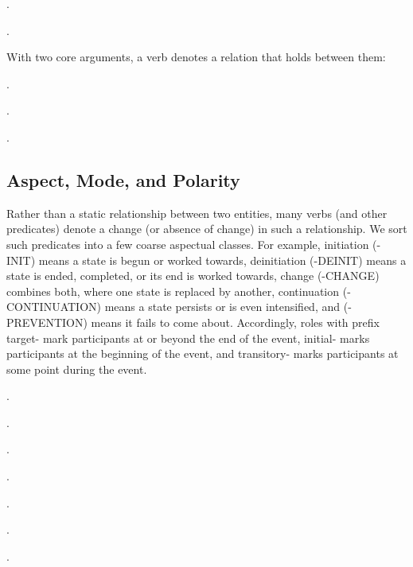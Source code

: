 \documentclass[a4paper]{article}
\newcommand{\frs}[1]{\mbox{\textsf{#1}}} %
\newcommand{\rl}[1]{\textsf{#1}}
\begin{document}
\ex.

\ex.

With two core arguments, a verb denotes a relation that holds between them:

\ex.

\ex.

\ex.


\newpage\subsection{Aspect, Mode, and Polarity}
\label{sec:aspect-mode-polarity}

Rather than a static relationship between two entities, many verbs (and other
predicates) denote a change (or absence of change) in such a relationship. We
sort such predicates into a few coarse aspectual classes. For example,
initiation (\frs{-INIT}) means a state is begun or worked towards, deinitiation
(\frs{-DEINIT}) means a state is ended, completed, or its end is worked
towards, change (\frs{-CHANGE}) combines both, where one state is replaced by
another, continuation (\frs{-CONTINUATION}) means a state persists or is even
intensified, and (\frs{-PREVENTION}) means it fails to come about.
Accordingly, roles with prefix \rl{target-} mark participants at or beyond the
end of the event, \rl{initial-} marks participants at the beginning of the
event, and \rl{transitory-} marks participants at some point during the event.

\ex.

\ex.

\ex.

\ex.

\ex.

\ex.\label{ex:fall}

\ex.
\end{document}
